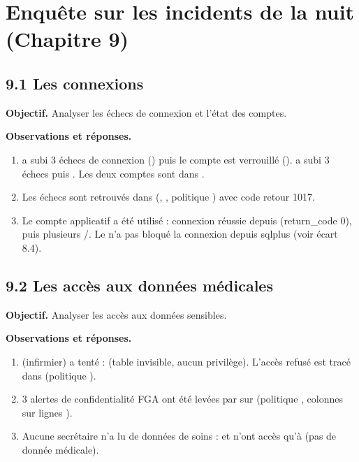 \section{Enquête sur les incidents de la nuit (Chapitre 9)}

\subsection{9.1 Les connexions}
\textbf{Objectif.} Analyser les échecs de connexion et l'état des comptes.

 

\textbf{Observations et réponses.}
\begin{enumerate}
  \item {} a subi 3 échecs de connexion () puis le compte est verrouillé ().  a subi 3 échecs puis . Les deux comptes sont  dans .
  \item Les échecs sont retrouvés dans  (, , politique ) avec code retour 1017.
  \item Le compte applicatif  a été utilisé : connexion réussie depuis  (return\_code 0), puis plusieurs /. Le  n'a pas bloqué la connexion depuis sqlplus (voir écart 8.4).
\end{enumerate}

\subsection{9.2 Les accès aux données médicales}
\textbf{Objectif.} Analyser les accès aux données sensibles.

\textbf{Observations et réponses.}
\begin{enumerate}
  \item {} (infirmier) a tenté  :  (table invisible, aucun privilège). L'accès refusé est tracé dans  (politique ).
  \item 3 alertes de confidentialité FGA ont été levées par  sur  (politique , colonnes  sur lignes ).
  \item Aucune secrétaire n'a lu de données de soins :  et  n'ont accès qu'à  (pas de donnée médicale).
\end{enumerate}

